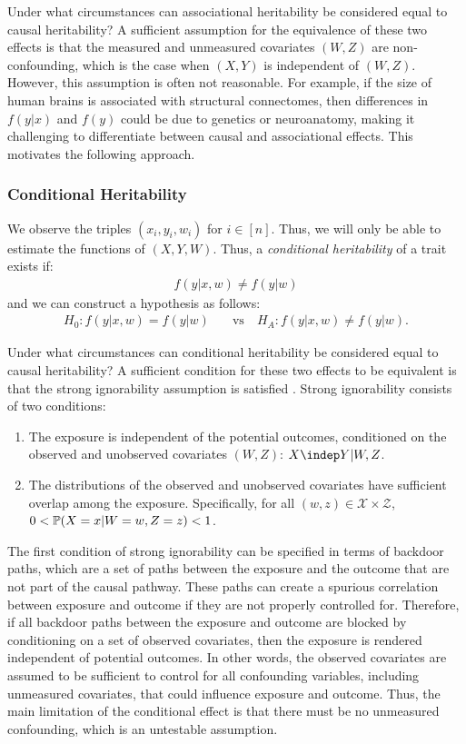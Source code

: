 Under what circumstances can associational heritability be considered equal to causal heritability? A sufficient assumption for the equivalence of these two effects is that the measured and unmeasured covariates $(W,Z)$ are non-confounding, which is the case when $(X, Y)$ is independent of $(W, Z)$. However, this assumption is often not reasonable. For example, if the size of human brains is associated with structural connectomes, then differences in $f(y|x)$ and $f(y)$ could be due to genetics or neuroanatomy, making it challenging to differentiate between causal and associational effects. This motivates the following approach.

\subsubsection{Conditional Heritability} \label{sec:cond-effect}
We observe the triples $(x_i, y_i, w_i)$ for $i\in[n]$. Thus, we will only be able to estimate the functions of $(X, Y, W)$. Thus, a \textit{conditional heritability} of a trait exists if:%
\begin{align*} 
    f(y|x, w) \neq f(y|w)
\end{align*}
and we can construct a hypothesis as follows:
\begin{align}
    H_0: f(y|x, w) = f(y|w) \quad &\text{vs} \quad 
    H_A: f(y|x, w) \neq f(y|w).
    \label{eq:conditional-hypothesis}
\end{align}

Under what circumstances can conditional heritability be considered equal to causal heritability? A sufficient condition for these two effects to be equivalent is that the strong ignorability assumption is satisfied \cite{rosenbaum1983central}. Strong ignorability consists of two conditions:
\begin{enumerate}[leftmargin=*]
    \item The exposure is independent of the potential outcomes, conditioned on the observed and unobserved covariates $(W,Z)$: $X\indep Y|  W, Z$.
    \item The distributions of the observed and unobserved covariates have sufficient overlap among the exposure. Specifically, for all $(w, z) \in \mathcal{X} \times \mathcal{Z}$, $0 < \mathbb{P}(X=x | W=w, Z=z) < 1$.
\end{enumerate}
The first condition of strong ignorability can be specified in terms of backdoor paths, which are a set of paths between the exposure and the outcome that are not part of the causal pathway. These paths can create a spurious correlation between exposure and outcome if they are not properly controlled for. Therefore, if all backdoor paths between the exposure and outcome are blocked by conditioning on a set of observed covariates, then the exposure is rendered independent of potential outcomes. In other words, the observed covariates are assumed to be sufficient to control for all confounding variables, including unmeasured covariates,  that could influence exposure and outcome. Thus, the main limitation of the conditional effect is that there must be no unmeasured confounding, which is an untestable assumption.

